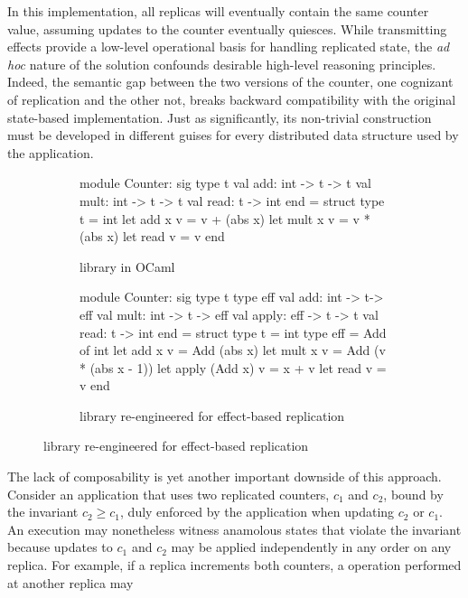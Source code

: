 In this implementation, all replicas will eventually contain the same
counter value, assuming updates to the counter eventually quiesces.
While transmitting effects provide a low-level operational basis for
handling replicated state, the \emph{ad hoc} nature of the solution
confounds desirable high-level reasoning principles.  Indeed, the
semantic gap between the two versions of the counter, one cognizant of
replication and the other not, breaks backward compatibility with the
original state-based implementation.  Just as significantly, its
non-trivial construction must be developed in different guises for
every distributed data structure used by the application.
\begin{figure}
\begin{subfigure}[b]{0.4\textwidth}
  \begin{ocaml}
    module Counter: sig
      type t
      val add: int -> t -> t
      val mult: int -> t -> t
      val read: t -> int
    end = struct
      type t = int
      let add x v = v + (abs x)
      let mult x v = v * (abs x)
      let read v = v
    end
  \end{ocaml}
\caption{ library in OCaml}
\label{fig:counter-adt}
\end{subfigure}
\begin{subfigure}[b]{0.56\textwidth}
  \begin{ocaml}
    module Counter: sig
      type t
      type eff 
      val add: int -> t-> eff
      val mult: int -> t -> eff
      val apply: eff -> t -> t
      val read: t -> int
    end = struct
      type t = int
      type eff = Add of int
      let add x v = Add (abs x)
      let mult x v = Add (v * (abs x - 1))
      let apply (Add x) v = x + v
      let read v = v
    end
  \end{ocaml}
\caption{ library re-engineered for effect-based replication}
\label{fig:counter-rdt}
\end{subfigure}
\end{figure}
The lack of composability is yet another important downside of this
approach.  Consider an application that uses two replicated counters,
$c_1$ and $c_2$, bound by the invariant $c_2 \ge c_1$, duly enforced
by the application when updating $c_2$ or $c_1$.  An execution may
nonetheless witness anamolous states that violate the invariant
because updates to $c_1$ and $c_2$ may be applied independently in any
order on any replica.  For example, if a replica increments both
counters, a  operation performed at another replica may
